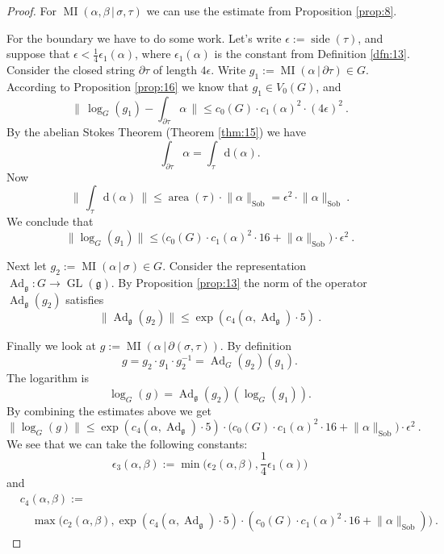 \documentclass[10pt, a4paper]{amsart}
\theoremstyle{definition}
\numberwithin{equation}{section}
\newcommand{\opn}{\operatorname}
\newcommand{\mfrak}[1]{\mathfrak{#1}}
\newcommand{\mrm}[1]{\mathrm{#1}}
\newcommand{\smfrac}[2]{{\textstyle \frac{#1}{#2}}}
\newcommand{\norm}[1]{\lVert #1 \rVert}
\newcommand{\Norm}[1]{\bigl\lVert\, #1 \, \bigr\rVert}
\renewcommand{\vert}{\, | \,}
\newcommand{\g}{\mfrak{g}}
\renewcommand{\d}{\mrm{d}}
\begin{document}
\begin{proof}
For $\opn{MI} (\alpha, \beta \vert \sigma, \tau)$ we can use the estimate from
Proposition \ref{prop:8}.

For the boundary we have to do some work. Let's write
$\epsilon := \opn{side}(\tau)$, and suppose that 
$\epsilon < \smfrac{1}{4} \epsilon_1(\alpha)$, where 
$\epsilon_1(\alpha)$ is the constant from Definition \ref{dfn:13}.
Consider the closed string $\partial \tau$ of length $4 \epsilon$. 
Write $g_1 := \opn{MI}(\alpha \vert \partial \tau) \in G$. 
According to Proposition \ref{prop:16} we know that 
$g_1 \in V_0(G)$, and 
\[ \Norm{ \log_G (g_1) - \int_{\partial \tau} \alpha } \leq 
c_0(G) \cdot c_1(\alpha)^2 \cdot (4 \epsilon)^2 \ . \]
By the abelian Stokes Theorem (Theorem \ref{thm:15}) we have
\[ \int_{\partial \tau} \alpha =  \int_{\tau} \d(\alpha) . \]
Now
\[ \Norm{ \int_{\tau} \d(\alpha) } \leq 
\opn{area}(\tau) \cdot \norm{\alpha}_{\mrm{Sob}} 
= \epsilon^2 \cdot  \norm{\alpha}_{\mrm{Sob}} \ . \]
We conclude that
\[ \norm{ \log_G (g_1) } \leq 
\bigl( c_0(G) \cdot c_1(\alpha)^2 \cdot 16 + \norm{\alpha}_{\mrm{Sob}} \bigr)
\cdot \epsilon^2 \ . \]

Next let 
$g_2 := \opn{MI}(\alpha \vert \sigma) \in G$.
Consider the representation 
$\opn{Ad}_{\g} : G \to \opn{GL}(\g)$. 
By Proposition \ref{prop:13} the norm of the operator 
$\opn{Ad}_{\g}(g_2)$ satisfies 
\[ \norm{ \opn{Ad}_{\g}(g_2) } \leq 
\exp( c_4(\alpha, \opn{Ad}_{\g}) \cdot 5) \ . \]

Finally we look at 
$g := \opn{MI} (\alpha \vert \partial(\sigma, \tau))$. 
By definition 
\[ g = g_2 \cdot g_1 \cdot g_2^{-1} = \opn{Ad}_{G}(g_2)(g_1) . \]
The logarithm is 
\[ \log_G(g) = \opn{Ad}_{\g}(g_2)(\log_G(g_1)) . \]
By combining the estimates above we get
\[ \norm{ \log_G(g) } \leq 
\exp( c_4(\alpha, \opn{Ad}_{\g}) \cdot 5) \cdot 
\bigl( c_0(G) \cdot c_1(\alpha)^2 \cdot 16 + \norm{\alpha}_{\mrm{Sob}} \bigr)
\cdot \epsilon^2 \ . \]
We see that we can take the following constants:
\[ \epsilon_3(\alpha, \beta) := \min \bigl( \epsilon_2(\alpha, \beta), 
\smfrac{1}{4} \epsilon_1(\alpha) \bigr) \] 
and 
\[ \begin{aligned}
& c_4(\alpha, \beta) := \\
& \quad \max \bigl( c_2(\alpha, \beta),
\exp( c_4(\alpha, \opn{Ad}_{\g}) \cdot 5) \cdot 
( c_0(G) \cdot c_1(\alpha)^2 \cdot 16 + \norm{\alpha}_{\mrm{Sob}} )
\bigr) \ . 
\end{aligned} \]
\end{proof}
\end{document}
